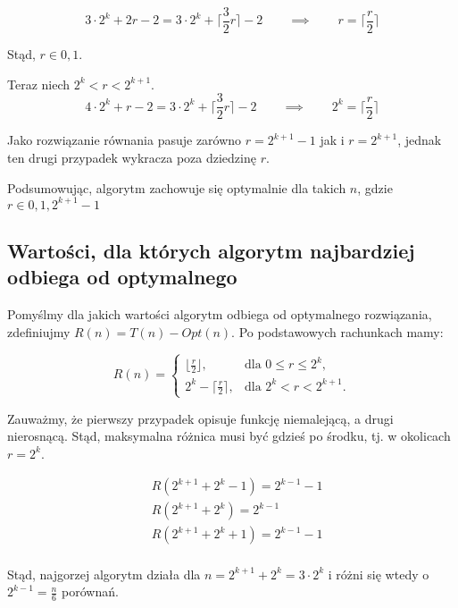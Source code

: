 \documentclass[a4paper,11pt]{article}
\begin{document}
\begin{equation}
 3 \cdot 2^k + 2r - 2 = 3 \cdot 2^k + \lceil \frac{3}{2} r \rceil - 2 \qquad \implies \qquad
 r = \lceil \frac{r}{2} \rceil
\end{equation}

Stąd, $r \in {0, 1}$.

Teraz niech $2^k < r < 2^{k+1}$.
\begin{equation}
 4 \cdot 2^k + r - 2 = 3 \cdot 2^k + \lceil \frac{3}{2} r \rceil - 2 \qquad \implies \qquad
 2^k = \lceil \frac{r}{2} \rceil
\end{equation}

Jako rozwiązanie równania pasuje zarówno $r = 2^{k+1} - 1$ jak i $r = 2^{k+1}$, jednak ten drugi przypadek wykracza poza dziedzinę $r$.

Podsumowując, algorytm zachowuje się optymalnie dla takich $n$, gdzie $r \in {0, 1, 2^{k+1} - 1}$

\subsection{Wartości, dla których algorytm najbardziej odbiega od optymalnego}

Pomyślmy dla jakich wartości algorytm odbiega od optymalnego rozwiązania, zdefiniujmy $R(n) = T(n) - Opt(n)$.
Po podstawowych rachunkach mamy:

\begin{equation}
 R(n) = \begin{cases}
  \lfloor \frac{r}{2} \rfloor,  		& \text{dla $0 \leq r \leq 2^k$,}\\
  2^k - \lceil \frac{r}{2} \rceil,       	& \text{dla $2^k < r < 2^{k+1}$.}
  \end{cases}
\end{equation}

Zauważmy, że pierwszy przypadek opisuje funkcję niemalejącą, a drugi nierosnącą. Stąd, maksymalna różnica musi być gdzieś po środku,
tj. w okolicach $r = 2^k$.

\begin{align}
 & R(2^{k+1} + 2^k - 1) = 2^{k-1} - 1 \\
 & R(2^{k+1} + 2^k) = 2^{k-1} \\
 & R(2^{k+1} + 2^k + 1) = 2^{k-1} - 1 \\
\end{align}

Stąd, najgorzej algorytm działa dla $n = 2^{k+1} + 2^k = 3 \cdot 2^k$ i różni się wtedy o $2^{k-1} = \frac{n}{6}$ porównań.
\end{document}
